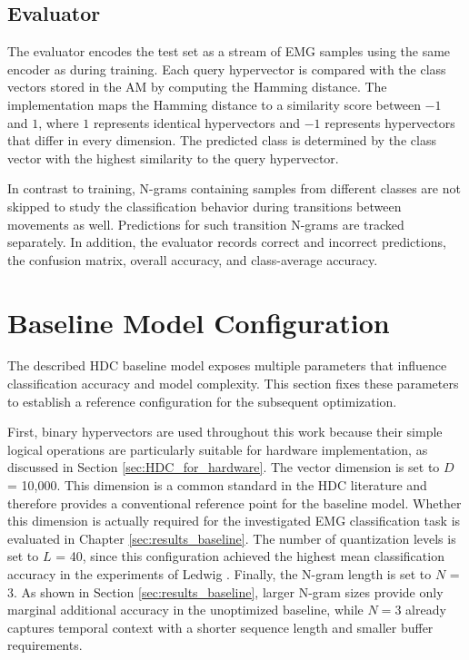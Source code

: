         \subsection{Evaluator}
        The evaluator encodes the test set as a stream of EMG samples using the same encoder as during training. Each query hypervector is compared with the class vectors stored in the AM by computing the Hamming distance. The implementation maps the Hamming distance to a similarity score between $-1$ and $1$, where $1$ represents identical hypervectors and $-1$ represents hypervectors that differ in every dimension. The predicted class is determined by the class vector with the highest similarity to the query hypervector.
        
        In contrast to training, N-grams containing samples from different classes are not skipped to study the classification behavior during transitions between movements as well. Predictions for such transition N-grams are tracked separately. In addition, the evaluator records correct and incorrect predictions, the confusion matrix, overall accuracy, and class-average accuracy.
        
    \section{Baseline Model Configuration}
    The described HDC baseline model exposes multiple parameters that influence classification accuracy and model complexity. This section fixes these parameters to establish a reference configuration for the subsequent optimization.
    
      First, binary hypervectors are used throughout this work because their simple logical operations are particularly suitable for hardware implementation, as discussed in Section \ref{sec:HDC_for_hardware}. The vector dimension is set to $D$ = 10,000. This dimension is a common standard in the HDC literature \cite{kanerva_hyperdimensional_2009,rahimi_hyperdimensional_2016,imani_fach_2019,hassan_hyper-dimensional_2022,yu_understanding_2022} and therefore provides a conventional reference point for the baseline model. Whether this dimension is actually required for the investigated EMG classification task is evaluated in Chapter \ref{sec:results_baseline}.
   The number of quantization levels is set to $L$ = 40, since this configuration achieved the highest mean classification accuracy in the experiments of Ledwig \cite{ledwig_vdl-implementierung_2025}. Finally, the N-gram length is set to $N$ = 3. As shown in Section \ref{sec:results_baseline}, larger N-gram sizes provide only marginal additional accuracy in the unoptimized baseline, while $N=3$ already captures temporal context with a shorter sequence length and smaller buffer requirements.

